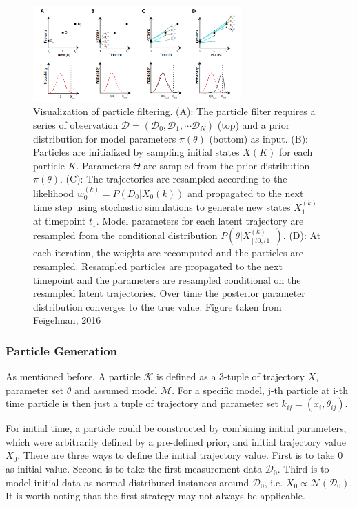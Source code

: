 \documentclass{bioinfo}
\begin{document}
\begin{figure}[h]
\includegraphics[width=8cm]{figures/particle_filtering.png}
\caption{Visualization of particle filtering. (A): The particle filter requires a series of observation $\mathcal{D} = (\mathcal{D}_0, \mathcal{D}_1, \cdots \mathcal{D}_N)$ (top) and a prior distribution for model parameters $\pi(\theta)$ (bottom) as input. (B): Particles are initialized by sampling initial states $X(K)$ for each particle $K$. Parameters $\Theta$ are sampled from the prior distribution $\pi(\theta)$. (C): The trajectories are resampled according to the likelihood $w_0^{(k)} = P(D_0|X_0(k))$ and propagated to the next time step using stochastic simulations to generate new states $X_1^{(k)}$ at timepoint $t_1$. Model parameters for each latent trajectory are resampled from the conditional distribution $P(\theta|X^{(k)}_{[t0,t1]})$. (D): At each iteration, the weights are recomputed and the particles are resampled. Resampled particles are propagated to the next timepoint and the parameters are resampled conditional on the resampled latent trajectories. Over time the posterior parameter distribution converges to the true value. Figure taken from Feigelman, 2016 \citealp{Feigelman16}}  \label{fig:03}
\end{figure}

\vspace*{-6pt}

\subsubsection{Particle Generation}

As mentioned before, A particle $\mathcal{K}$ is defined as a 3-tuple of trajectory $X$, parameter set $\theta$ and assumed model $\mathcal{M}$. For a specific model, j-th particle at i-th time particle is then just a tuple of trajectory and parameter set $k_{ij} = (x_i, \theta_{ij})$.

For initial time, a particle could be constructed by combining initial parameters, which were arbitrarily defined by a pre-defined prior, and initial trajectory value $X_0$. There are three ways to define the initial trajectory value. First is to take 0 as initial value. Second is to take the first measurement data $\mathcal{D}_0$. Third is to model initial data as normal distributed instances around $\mathcal{D}_0$, i.e. $X_0 \propto \mathcal{N}(\mathcal{D}_0)$. It is worth noting that the first strategy may not always be applicable.
\end{document}
